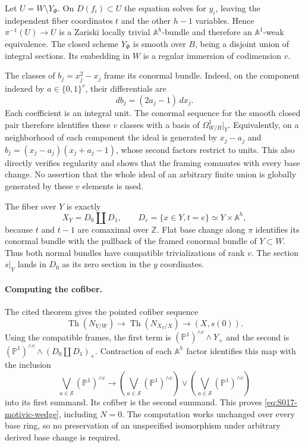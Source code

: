 Let $U=W\setminus Y_\Phi$. On $D(f_i)\subset U$ the equation solves
for $y_i$, leaving the independent fiber coordinates $t$ and the other
$h-1$ variables. Hence $\pi^{-1}(U)\to U$ is a Zariski locally trivial
$\mathbb A^h$-bundle and therefore an $\mathbb A^1$-weak equivalence.
The closed scheme $Y_\Phi$ is smooth over $B$, being a disjoint union of
integral sections. Its embedding in $W$ is a regular immersion of
codimension $v$.

The classes of $b_j=x_j^2-x_j$ frame its conormal bundle. Indeed, on
the component indexed by $a\in\{0,1\}^v$, their differentials are
\[
                  db_j=(2a_j-1)\,dx_j.
\]
Each coefficient is an integral unit. The conormal sequence for the
smooth closed pair therefore identifies these $v$ classes with a basis
of $\Omega^1_{W/B}|_Y$. Equivalently, on a neighborhood of each component
the ideal is generated by $x_j-a_j$ and $b_j=(x_j-a_j)(x_j+a_j-1)$,
whose second factors restrict to units. This also directly verifies
regularity and shows that the framing commutes with every base change.
No assertion that the whole ideal of an arbitrary finite union is
globally generated by these $v$ elements is used.

The fiber over $Y$ is exactly
\[
 X_Y=D_0\amalg D_1,\qquad D_e=\{x\in Y,t=e\}\simeq Y\times\mathbb A^h,
\]
because $t$ and $t-1$ are comaximal over $\mathbb Z$. Flat base change
along $\pi$ identifies its conormal bundle with the pullback of the
framed conormal bundle of $Y\subset W$. Thus both normal bundles have
compatible trivializations of rank $v$. The section $s|_Y$ lands in
$D_0$ as its zero section in the $y$ coordinates.

\paragraph{Computing the cofiber.}
The cited theorem gives the pointed cofiber sequence
\[
 \operatorname{Th}(N_{Y/W})\longrightarrow
 \operatorname{Th}(N_{X_Y/X})\longrightarrow (X,s(0)).
\]
Using the compatible frames, the first term is
$(\mathbb P^1)^{\wedge v}\wedge Y_+$ and the second is
$(\mathbb P^1)^{\wedge v}\wedge(D_0\amalg D_1)_+$.
Contraction of each $\mathbb A^h$ factor identifies this map with the
inclusion
\[
 \bigvee_{a\in\mathcal S}(\mathbb P^1)^{\wedge v}
 \longrightarrow
 \left(\bigvee_{a\in\mathcal S}(\mathbb P^1)^{\wedge v}\right)
 \vee\left(\bigvee_{a\in\mathcal S}(\mathbb P^1)^{\wedge v}\right)
\]
into its first summand. Its cofiber is the second summand. This proves
\eqref{eq:S017-motivic-wedge}, including $N=0$. The computation works
unchanged over every base ring, so no preservation of an unspecified
isomorphism under arbitrary derived base change is required.

